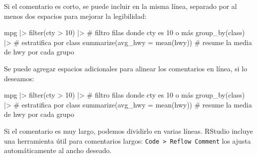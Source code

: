 \documentclass[
  spanish,
  letterpaper,
  DIV=11,
  numbers=noendperiod]{scrreprt}
\newenvironment{Shaded}{\begin{snugshade}}{\end{snugshade}}
\newcommand{\AttributeTok}[1]{\textcolor[rgb]{0.40,0.45,0.13}{#1}}
\newcommand{\CommentTok}[1]{\textcolor[rgb]{0.37,0.37,0.37}{#1}}
\newcommand{\DecValTok}[1]{\textcolor[rgb]{0.68,0.00,0.00}{#1}}
\newcommand{\FunctionTok}[1]{\textcolor[rgb]{0.28,0.35,0.67}{#1}}
\newcommand{\NormalTok}[1]{\textcolor[rgb]{0.00,0.23,0.31}{#1}}
\newcommand{\SpecialCharTok}[1]{\textcolor[rgb]{0.37,0.37,0.37}{#1}}
\begin{document}
Si el comentario es corto, se puede incluir en la misma línea, separado
por al menos dos espacios para mejorar la legibilidad:

\begin{Shaded}
\begin{Highlighting}[]
\NormalTok{mpg }\SpecialCharTok{|\textgreater{}}
  \FunctionTok{filter}\NormalTok{(cty }\SpecialCharTok{\textgreater{}} \DecValTok{10}\NormalTok{) }\SpecialCharTok{|\textgreater{}} \CommentTok{\# filtro filas donde cty es 10 o más}
  \FunctionTok{group\_by}\NormalTok{(class) }\SpecialCharTok{|\textgreater{}} \CommentTok{\# estratifica por class}
  \FunctionTok{summarize}\NormalTok{(}\AttributeTok{avg\_hwy =} \FunctionTok{mean}\NormalTok{(hwy)) }\CommentTok{\# resume la media de hwy por cada grupo}
\end{Highlighting}
\end{Shaded}

Se puede agregar espacios adicionales para alinear los comentarios en
línea, si lo deseamos:

\begin{Shaded}
\begin{Highlighting}[]
\NormalTok{mpg }\SpecialCharTok{|\textgreater{}}
  \FunctionTok{filter}\NormalTok{(cty }\SpecialCharTok{\textgreater{}} \DecValTok{10}\NormalTok{) }\SpecialCharTok{|\textgreater{}} \CommentTok{\# filtro filas donde cty es 10 o más}
  \FunctionTok{group\_by}\NormalTok{(class) }\SpecialCharTok{|\textgreater{}} \CommentTok{\# estratifica por class}
  \FunctionTok{summarize}\NormalTok{(}\AttributeTok{avg\_hwy =} \FunctionTok{mean}\NormalTok{(hwy)) }\CommentTok{\# resume la media de hwy por cada grupo}
\end{Highlighting}
\end{Shaded}

Si el comentario es muy largo, podemos dividirlo en varias líneas.
RStudio incluye una herramienta útil para comentarios largos:
\texttt{Code\ \textgreater{}\ Reflow\ Comment} los ajusta
automáticamente al ancho deseado.
\end{document}
